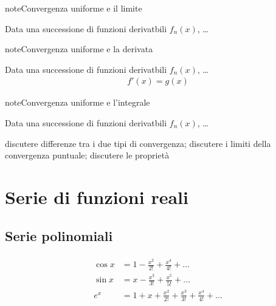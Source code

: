 \documentclass[letterpaper,10pt,italian]{jupyterBook}
\begin{document}
\begin{sphinxadmonition}{note}{Convergenza uniforme e il limite}

\sphinxAtStartPar
Data una successione di funzioni derivatbili \(f_n(x)\), …
\end{sphinxadmonition}

\begin{sphinxadmonition}{note}{Convergenza uniforme e la derivata}

\sphinxAtStartPar
Data una successione di funzioni derivatbili \(f_n(x)\), …
\begin{equation*}
\begin{split}f'(x) = g(x)\end{split}
\end{equation*}\end{sphinxadmonition}

\begin{sphinxadmonition}{note}{Convergenza uniforme e l’integrale}

\sphinxAtStartPar
Data una successione di funzioni derivatbili \(f_n(x)\), …
\end{sphinxadmonition}

\sphinxAtStartPar
{} discutere differenze tra i due tipi di convergenza; discutere i limiti della convergenza puntuale; discutere le proprietà


\section{Serie di funzioni reali}
\label{\detokenize{ch/series:serie-di-funzioni-reali}}\label{\detokenize{ch/series:math-hs-series-fun-series}}

\subsection{Serie polinomiali}
\label{\detokenize{ch/series:serie-polinomiali}}
\sphinxAtStartPar
{} 
\begin{equation*}
\begin{split}\begin{aligned}
   \cos x & = 1 - \frac{x^2}{2!} + \frac{x^4}{4!} + \dots \\
   \sin x & = x - \frac{x^3}{3!} + \frac{x^5}{5!} + \dots \\
   e^x    & = 1 + x + \frac{x^2}{2!} + \frac{x^3}{3!} + \frac{x^4}{4!} + \dots \\
\end{aligned}\end{split}
\end{equation*}
\sphinxAtStartPar
{} 
\end{document}
